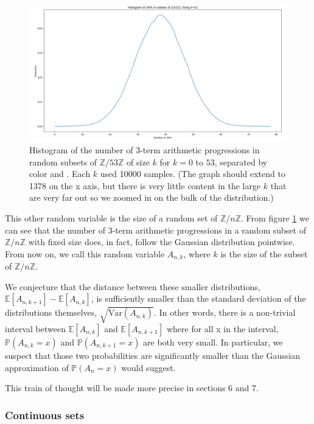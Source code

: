 \documentclass[12pt]{article} %
\newcommand{\Var}{\mathrm{Var}}
\renewcommand{\P}{\mathbb{P}}
\newcommand{\E}{\mathbb{E}}
\newcommand{\Z}{\mathbb{Z}}
\theoremstyle{definition}
\theoremstyle{definition}
\begin{document}
\begin{figure}[t]
	\centering
    \includegraphics[width=\textwidth]{3ap-fixed-k}
    \caption{Histogram of the number of 3-term arithmetic progressions in random subsets of $\Z/53\Z$ of size $k$ for $k=0$ to $53$, separated by color and . Each $k$ used 10000 samples. (The graph should extend to 1378 on the x axis, but there is very little content in the large $k$ that are very far out so we zoomed in on the bulk of the distribution.)}
    \label{fig:3ap-k}
\end{figure}

This other random variable is the size of a random set of $\Z / n\Z$. From figure \ref{fig:3ap-k} we can see that the number of 3-term arithmetic progressions in a random subset of $\Z / n \Z$ with fixed size does, in fact, follow the Gaussian distribution pointwise. From now on, we call this random variable $A_{n, k}$, where $k$ is the size of the subset of $\Z / n\Z$.

We conjecture that the distance between these smaller distributions, $\E[A_{n,k+1}]-\E[A_{n,k}]$, is sufficiently smaller than the standard deviation of the distributions themselves, $\sqrt{\Var(A_{n, k})}$. In other words, there is a non-trivial interval between $\E[A_{n, k}]$ and $\E[A_{n, k+1}]$ where for all x in the interval, $\P(A_{n, k}=x)$ and $\P(A_{n, k+1} = x)$ are both very small. In particular, we suspect that those two probabilities are significantly smaller than the Gaussian approximation of $\P(A_n = x)$ would suggest.

This train of thought will be made more precise in sections 6 and 7.

\subsubsection{Continuous sets}
\end{document}

